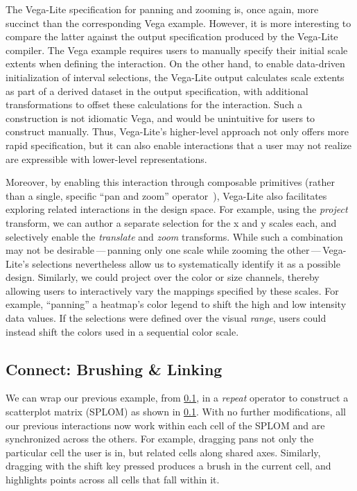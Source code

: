 The Vega-Lite specification for panning and zooming is, once again, more
succinct than the corresponding Vega example. However, it is more interesting to
compare the latter against the output specification produced by the Vega-Lite
compiler. The Vega example requires users to manually specify their initial
scale extents when defining the interaction. On the other hand, to enable
data-driven initialization of interval selections, the Vega-Lite output
calculates scale extents as part of a derived dataset in the output
specification, with additional transformations to offset these calculations for
the interaction. Such a construction is not idiomatic Vega, and would be
unintuitive for users to construct manually. Thus, Vega-Lite's higher-level
approach not only offers more rapid specification, but it can also enable
interactions that a user may not realize are expressible with lower-level
representations.

Moreover, by enabling this interaction through composable primitives (rather
than a single, specific ``pan and zoom'' operator~\cite{bostock:d3}), Vega-Lite
also facilitates exploring related interactions in the design space. For
example, using the \emph{project} transform, we can author a separate selection
for the x and y scales each, and selectively enable the \emph{translate} and
\emph{zoom} transforms. While such a combination may not be
desirable\,---\,panning only one scale while zooming the other\,---\,Vega-Lite's
selections nevertheless allow us to systematically identify it as a possible
design. Similarly, we could project over the color or size channels, thereby
allowing users to interactively vary the mappings specified by these scales. For
example, ``panning'' a heatmap's color legend to shift the high and low
intensity data values. If the selections were defined over the visual
\emph{range}, users could instead shift the colors used in a sequential color
scale.

\subsection{Connect: Brushing \& Linking}

We can wrap our previous example, from \cref{}, in a
\emph{repeat} operator to construct a scatterplot matrix (SPLOM) as shown in
\cref{}. With no further modifications, all our previous
interactions now work within each cell of the SPLOM and are synchronized across
the others. For example, dragging pans not only the particular cell the user is
in, but related cells along shared axes. Similarly, dragging with the shift key
pressed produces a brush in the current cell, and highlights points across
all cells that fall within it.

